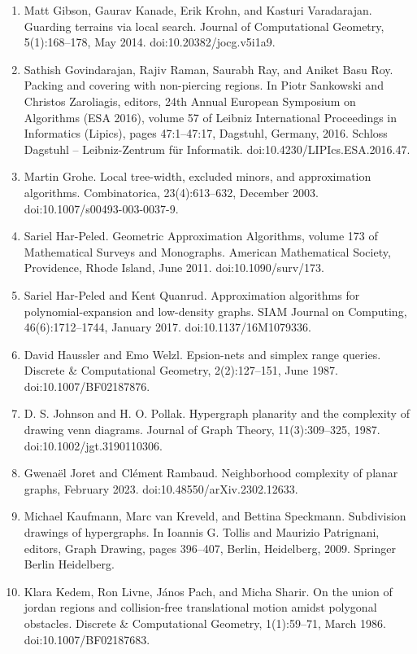\documentclass[10pt,a4paper]{article}
\begin{document}
\begin{enumerate}
\item[]  [31]  Matt Gibson, Gaurav Kanade, Erik Krohn, and Kasturi Varadarajan.  Guarding terrains via local search.  Journal of Computational Geometry, 5(1):168–178, May 2014.  doi:10.20382/jocg.v5i1a9.  
\item[]  [32]  Sathish Govindarajan, Rajiv Raman, Saurabh Ray, and Aniket Basu Roy.  Packing and covering with non-piercing regions.  In Piotr Sankowski and Christos Zaroliagis, editors, 24th Annual European Symposium on Algorithms (ESA 2016), volume 57 of Leibniz International Proceedings in Informatics (Lipics), pages 47:1–47:17, Dagstuhl, Germany, 2016. Schloss Dagstuhl – Leibniz-Zentrum für Informatik.  doi:10.4230/LIPIcs.ESA.2016.47.  
\item[]  [33]  Martin Grohe.  Local tree-width, excluded minors, and approximation algorithms.  Combinatorica, 23(4):613–632, December 2003.  doi:10.1007/s00493-003-0037-9.  
\item[]  [34]  Sariel Har-Peled.  Geometric Approximation Algorithms, volume 173 of Mathematical Surveys and Monographs.  American Mathematical Society, Providence, Rhode Island, June 2011.  doi:10.1090/surv/173.  
\item[]  [35]  Sariel Har-Peled and Kent Quanrud.  Approximation algorithms for polynomial-expansion and low-density graphs.  SIAM Journal on Computing, 46(6):1712–1744, January 2017.  doi:10.1137/16M1079336.  
\item[]  [36]  David Haussler and Emo Welzl.  Epsion-nets and simplex range queries.  Discrete \& Computational Geometry, 2(2):127–151, June 1987.  doi:10.1007/BF02187876.  
\item[]  [37]  D. S. Johnson and H. O. Pollak.  Hypergraph planarity and the complexity of drawing venn diagrams.  Journal of Graph Theory, 11(3):309–325, 1987.  doi:10.1002/jgt.3190110306.  
\item[]  [38]  Gwenaël Joret and Clément Rambaud.  Neighborhood complexity of planar graphs, February 2023.  doi:10.48550/arXiv.2302.12633.  
\item[]  [39]  Michael Kaufmann, Marc van Kreveld, and Bettina Speckmann.  Subdivision drawings of hypergraphs.  In Ioannis G. Tollis and Maurizio Patrignani, editors, Graph Drawing, pages 396–407, Berlin, Heidelberg, 2009. Springer Berlin Heidelberg.  
\item[]  [40]  Klara Kedem, Ron Livne, János Pach, and Micha Sharir.  On the union of jordan regions and collision-free translational motion amidst polygonal obstacles.  Discrete \& Computational Geometry, 1(1):59–71, March 1986.  doi:10.1007/BF02187683.  

\end{enumerate}
\end{document}

